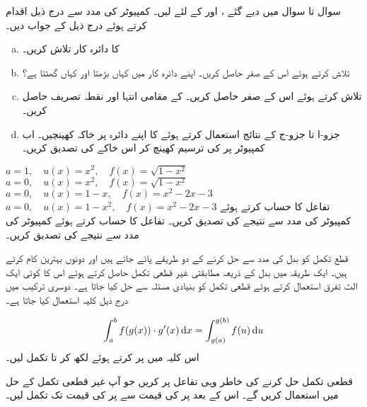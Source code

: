 سوال  تا سوال  میں دیے گئے ،  اور  کے لئے  لیں۔ کمپیوٹر کی مدد سے درج ذیل اقدام کرتے ہوئے درج ذیل کے جواب دیں۔
\begin{enumerate}[a.]
\item
{} کا دائرہ کار تلاش کریں۔
\item
{} تلاش کرتے ہوئے اس کے صفر حاصل کریں۔ اپنے دائرہ کار میں کہاں  بڑھتا اور کہاں گھٹتا ہے؟
\item
{} تلاش کرتے ہوئے اس کے صفر حاصل کریں۔ کے مقامی انتہا اور نقطہ تصریف حاصل کریں۔
\item
جزو-ا تا جزو-ج کے نتائج استعمال کرتے ہوئے  کا اپنے دائرہ پر خاکہ کھینچیں۔ اب کمپیوٹر پر  کی ترسیم کھینچ کر اس خاکے کی تصدیق کریں۔
\end{enumerate}
$a=1,\quad u(x)=x^2,\quad f(x)=\sqrt{1-x^2}$
$a=0,\quad u(x)=x^2,\quad f(x)=\sqrt{1-x^2}$
$a=0,\quad u(x)=1-x,\quad f(x)=x^2-2x-3$
$a=0,\quad u(x)=1-x^2,\quad f(x)=x^2-2x-3$
تفاعل  کا حساب کرتے ہوئے کمپیوٹر کی مدد سے نتیجے کی تصدیق کریں۔
تفاعل  کا حساب کرتے ہوئے کمپیوٹر کی مدد سے نتیجے کی تصدیق کریں۔

قطع تکمل کو بدل کی مدد سے حل کرنے کے دو طریقے پائے جاتے ہیں اور دونوں بہترین کام کرتے ہیں۔ ایک طریقہ میں بدل کے ذریعہ مطابقتی غیر قطعی تکمل حاصل کرتے ہوئے اس کا کوئی ایک الٹ تفرق استعمال کرتے ہوئے قطعی تکمل کو بنیادی مسئلہ سے حل کیا جاتا ہے۔ دوسری ترکیب میں درج ذیل کلیہ استعمال کیا جاتا ہے۔

\begin{align}\label{مساوات_تکمل_کلیہ_بدل}
\int_a^bf(g(x))\cdot g'(x)\dif x=\int_{g(a)}^{g(b)}f(u)\dif u
\end{align}
اس کلیہ میں  پر کرتے ہوئے  لکھ کر  تا  تکمل لیں۔

قطعی تکمل حل کرنے کی خاطر وہی  تفاعل پر کریں جو آپ غیر قطعی تکمل کے حل میں استعمال کریں گے۔ اس کے بعد  پر  کی قیمت سے  پر  کی قیمت تک تکمل لیں۔

